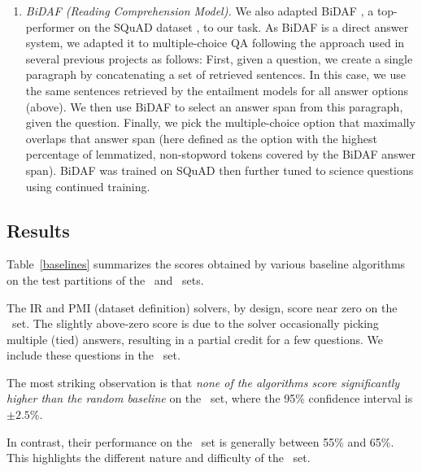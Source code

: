 \begin{enumerate}
The DGEM model uses a structured representation of the hypothesis $h_{i}$, extracted with a proprietary parser plus Open IE. To create a releasable version of DGEM, we also evaluate (and release) a variant DGEM-OpenIE, a version of DGEM that only uses Open IE to create the structured representation of $h_{i}$, thus avoiding proprietary tools.

\item \textit{BiDAF (Reading Comprehension Model).} We also adapted BiDAF \cite{Seo2016BidirectionalAF}, a top-performer on the SQuAD dataset \cite{rajpurkar2016squad}, to our task. As BiDAF is a direct answer system, we adapted it to multiple-choice QA following the approach used in several previous projects \cite{khashabi2018question,welbl2017crowdsourcing,kembhavi2017you} as follows: First, given a question, we create a single paragraph by concatenating a set of retrieved sentences. In this case, we use the same sentences retrieved by the entailment models for all answer options (above). We then use BiDAF to select an answer span from this paragraph, given the question. Finally, we pick the multiple-choice option that maximally overlaps that answer span (here defined as the option with the highest percentage of lemmatized, non-stopword tokens covered by the BiDAF answer span). BiDAF was trained on SQuAD then further tuned to science questions using continued training.
\end{enumerate}

\subsection{Results}

Table~\ref{baselines} summarizes the scores obtained by various baseline algorithms on the test partitions of the \Challenge~and \Additional~sets.

The IR and PMI (dataset definition) solvers, by design, score near zero on the \Challenge~set. The slightly above-zero score is due to the solver occasionally picking multiple (tied) answers, resulting in a partial credit for a few questions. We include these questions in the \Challenge~set.

The most striking observation is that \emph{none of the algorithms score significantly higher than the random baseline} on the \Challenge~set, where the 95\% confidence interval is $\pm 2.5\%$.

In contrast, their performance on the \Additional~set is generally between 55\% and 65\%.
This highlights the different nature and difficulty of the \Challenge~set.

